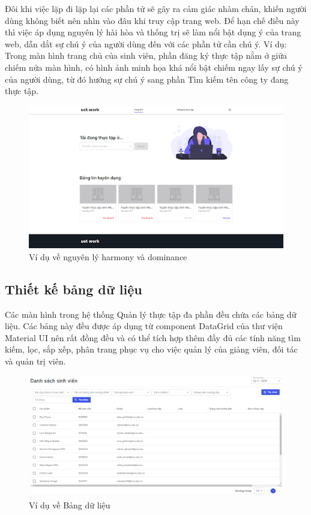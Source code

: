 \documentclass[./../main.tex]{subfiles}
\begin{document}
Đôi khi việc lặp đi lặp lại các phần tử sẽ gây ra cảm giác nhàm chán, khiến người dùng không biết nên nhìn vào đâu khi truy cập trang web. Để hạn chế điều này thì việc áp dụng nguyên lý hài hòa và thống trị sẽ làm nổi bật dụng ý của trang web, dẫn dắt sự chú ý của người dùng đến với các phần tử cần chú ý. Ví dụ: Trong màn hình trang chủ của sinh viên, phần đăng ký thực tập nằm ở giữa chiếm nửa màn hình, có hình ảnh minh họa khá nổi bật chiếm ngay lấy sự chú ý của người dùng, từ đó hướng sự chú ý sang phần Tìm kiếm tên công ty đang thực tập.

\begin{figure}[H]
	\includegraphics[width=\linewidth]{./images/image35.png}
	\caption{Ví dụ về nguyên lý harmony và dominance}
	\label{fig:example_harmony_dominance}
\end{figure}

\subsection{Thiết kế bảng dữ liệu}

Các màn hình trong hệ thống Quản lý thực tập đa phần đều chứa các bảng dữ liệu. Các bảng này đều được áp dụng từ component DataGrid của thư viện Material UI nên rất đồng đều và có thể tích hợp thêm đầy đủ các tính năng tìm kiếm, lọc, sắp xếp, phân trang phục vụ cho việc quản lý của giảng viên, đối tác và quản trị viên.

\begin{figure}[H]
	\includegraphics[width=\linewidth]{./images/image36.png}
	\caption{Ví dụ về Bảng dữ liệu}
	\label{fig:example_data_table}
\end{figure}
\end{document}

